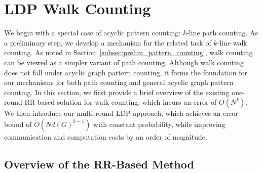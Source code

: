 \section{LDP Walk Counting}
\label{sec:k-wk}


We begin with a special case of acyclic pattern counting: $k$-line path counting. 
As a preliminary step, we develop a mechanism for the related task of $k$-line walk counting.
As noted in Section~\ref{subsec:prelim_pattern_counting}, walk counting can be viewed as a simpler variant of path counting.
Although walk counting does not fall under acyclic graph pattern counting, it forms the foundation for our mechanisms for both path counting and general acyclic graph pattern counting.
{In this section, we first provide a brief overview of the existing one-round RR-based solution for walk counting, which incurs an error of $O(N^k)$.}
We then introduce our multi-round LDP approach, which achieves an error bound of $\tilde{O}(Nd(G)^{k-1})$ with constant probability, while improving communication and computation costs by an order of magnitude.

 

\subsection{{Overview of the RR-Based Method}}
\label{subsec:strawman}





